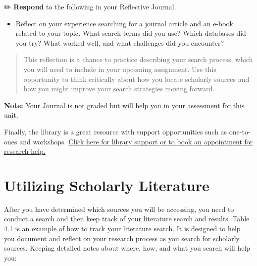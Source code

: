 \documentclass[
  letterpaper,
  DIV=11,
  numbers=noendperiod]{scrreprt}
\providecommand{\tightlist}{%
  \setlength{\itemsep}{0pt}\setlength{\parskip}{0pt}}\usepackage{longtable,booktabs,array}
\begin{document}
✏️ \textbf{Respond} to the following in your Reflective Journal.

\begin{itemize}
\tightlist
\item
  Reflect on your experience searching for a journal article and an
  e-book related to your topic\textbf{.} What search terms did you use?
  Which databases did you try? What worked well, and what challenges did
  you encounter?
\end{itemize}

\begin{quote}
This reflection is a chance to practice describing your search process,
which you will need to include in your upcoming assignment. Use this
opportunity to think critically about how you locate scholarly sources
and how you might improve your search strategies moving forward.
\end{quote}

\textbf{Note:} Your Journal is not graded but will help you in your
assessment for this unit.

Finally, the library is a great resource with support opportunities such
as one-to-ones and workshops.
\href{https://libguides.twu.ca/help?_gl=1*1npsrd0*_ga*MTc4MzI2NDA1OS4xNzM3ODYyMDE0*_ga_NZ4GVM10JT*czE3NTI1MTYzNTAkbzEzMCRnMSR0MTc1MjUxNjM2MSRqNDkkbDAkaDA.}{Click
here for library support or to book an appointment for research help.}


\chapter*{}\label{section-6}

\markboth{}{}


\chapter*{Utilizing Scholarly
Literature}\label{utilizing-scholarly-literature}


After you have determined which sources you will be accessing, you need
to conduct a search and then keep track of your literature search and
results. Table 4.1 is an example of how to track your literature search.
It is designed to help you document and reflect on your research process
as you search for scholarly sources. Keeping detailed notes about where,
how, and what you search will help you:
\end{document}
